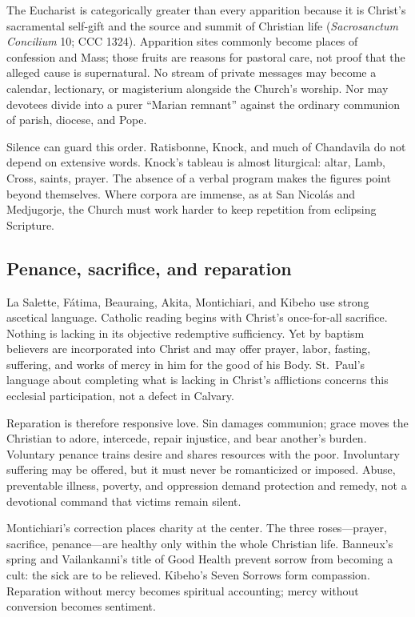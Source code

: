 The Eucharist is categorically greater than every apparition because it is Christ's sacramental self-gift and the source and summit of Christian life (\emph{Sacrosanctum Concilium} 10; CCC 1324). Apparition sites commonly become places of confession and Mass; those fruits are reasons for pastoral care, not proof that the alleged cause is supernatural. No stream of private messages may become a calendar, lectionary, or magisterium alongside the Church's worship. Nor may devotees divide into a purer ``Marian remnant'' against the ordinary communion of parish, diocese, and Pope.

Silence can guard this order. Ratisbonne, Knock, and much of Chandavila do not depend on extensive words. Knock's tableau is almost liturgical: altar, Lamb, Cross, saints, prayer. The absence of a verbal program makes the figures point beyond themselves. Where corpora are immense, as at San Nicolás and Medjugorje, the Church must work harder to keep repetition from eclipsing Scripture.

\subsection{Penance, sacrifice, and reparation}

La Salette, Fátima, Beauraing, Akita, Montichiari, and Kibeho use strong ascetical language. Catholic reading begins with Christ's once-for-all sacrifice. Nothing is lacking in its objective redemptive sufficiency. Yet by baptism believers are incorporated into Christ and may offer prayer, labor, fasting, suffering, and works of mercy in him for the good of his Body. St.~Paul's language about completing what is lacking in Christ's afflictions concerns this ecclesial participation, not a defect in Calvary.

Reparation is therefore responsive love. Sin damages communion; grace moves the Christian to adore, intercede, repair injustice, and bear another's burden. Voluntary penance trains desire and shares resources with the poor. Involuntary suffering may be offered, but it must never be romanticized or imposed. Abuse, preventable illness, poverty, and oppression demand protection and remedy, not a devotional command that victims remain silent.

Montichiari's correction places charity at the center. The three roses---prayer, sacrifice, penance---are healthy only within the whole Christian life. Banneux's spring and Vailankanni's title of Good Health prevent sorrow from becoming a cult: the sick are to be relieved. Kibeho's Seven Sorrows form compassion. Reparation without mercy becomes spiritual accounting; mercy without conversion becomes sentiment.

